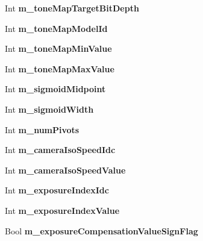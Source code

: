 \begin{DoxyCompactItemize}
Int {\bfseries m\+\_\+tone\+Map\+Target\+Bit\+Depth}
\item 
\mbox{\label{class_t_app_enc_cfg_aafd2892c31466413fe429d872fdf6783}} 
Int {\bfseries m\+\_\+tone\+Map\+Model\+Id}
\item 
\mbox{\label{class_t_app_enc_cfg_a162addbdc782eb44a5f501ee17059ded}} 
Int {\bfseries m\+\_\+tone\+Map\+Min\+Value}
\item 
\mbox{\label{class_t_app_enc_cfg_a20696d532bca9f095b80a45af394227d}} 
Int {\bfseries m\+\_\+tone\+Map\+Max\+Value}
\item 
\mbox{\label{class_t_app_enc_cfg_af828c52d0e3dc4b4ca976bb2d2a73a45}} 
Int {\bfseries m\+\_\+sigmoid\+Midpoint}
\item 
\mbox{\label{class_t_app_enc_cfg_a67f73c428696d46f74921229060755a2}} 
Int {\bfseries m\+\_\+sigmoid\+Width}
\item 
\mbox{\label{class_t_app_enc_cfg_a41308a4c2979369ff2188be1b356bac8}} 
Int {\bfseries m\+\_\+num\+Pivots}
\item 
\mbox{\label{class_t_app_enc_cfg_a68d1f0b554667b8f5d3133aa2ce73a3a}} 
Int {\bfseries m\+\_\+camera\+Iso\+Speed\+Idc}
\item 
\mbox{\label{class_t_app_enc_cfg_ad5ac379369bdb79293816bd5f135b792}} 
Int {\bfseries m\+\_\+camera\+Iso\+Speed\+Value}
\item 
\mbox{\label{class_t_app_enc_cfg_a7d988c881eb8c5dd1e6fac2e1d28f668}} 
Int {\bfseries m\+\_\+exposure\+Index\+Idc}
\item 
\mbox{\label{class_t_app_enc_cfg_a3688f97695959e59a88781ef59eaaf3d}} 
Int {\bfseries m\+\_\+exposure\+Index\+Value}
\item 
\mbox{\label{class_t_app_enc_cfg_adb8e04be18be5aa0b536344379bcac40}} 
Bool {\bfseries m\+\_\+exposure\+Compensation\+Value\+Sign\+Flag}
\item 

\end{DoxyCompactItemize}
